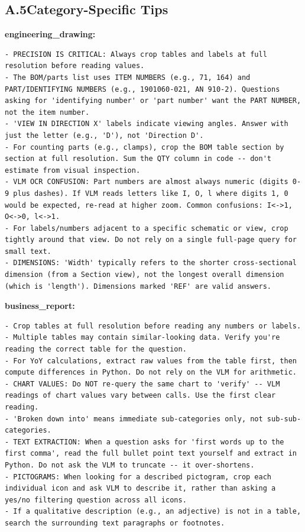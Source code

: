 \documentclass[10pt,twocolumn]{article}
\begin{document}
\subsection*{A.5\quad Category-Specific Tips}

\textbf{engineering\_drawing:}
\begin{lstlisting}
- PRECISION IS CRITICAL: Always crop tables and labels at full resolution before reading values.
- The BOM/parts list uses ITEM NUMBERS (e.g., 71, 164) and PART/IDENTIFYING NUMBERS (e.g., 1901060-021, AN 910-2). Questions asking for 'identifying number' or 'part number' want the PART NUMBER, not the item number.
- 'VIEW IN DIRECTION X' labels indicate viewing angles. Answer with just the letter (e.g., 'D'), not 'Direction D'.
- For counting parts (e.g., clamps), crop the BOM table section by section at full resolution. Sum the QTY column in code -- don't estimate from visual inspection.
- VLM OCR CONFUSION: Part numbers are almost always numeric (digits 0-9 plus dashes). If VLM reads letters like I, O, l where digits 1, 0 would be expected, re-read at higher zoom. Common confusions: I<->1, O<->0, l<->1.
- For labels/numbers adjacent to a specific schematic or view, crop tightly around that view. Do not rely on a single full-page query for small text.
- DIMENSIONS: 'Width' typically refers to the shorter cross-sectional dimension (from a Section view), not the longest overall dimension (which is 'length'). Dimensions marked 'REF' are valid answers.
\end{lstlisting}

\textbf{business\_report:}
\begin{lstlisting}
- Crop tables at full resolution before reading any numbers or labels.
- Multiple tables may contain similar-looking data. Verify you're reading the correct table for the question.
- For YoY calculations, extract raw values from the table first, then compute differences in Python. Do not rely on the VLM for arithmetic.
- CHART VALUES: Do NOT re-query the same chart to 'verify' -- VLM readings of chart values vary between calls. Use the first clear reading.
- 'Broken down into' means immediate sub-categories only, not sub-sub-categories.
- TEXT EXTRACTION: When a question asks for 'first words up to the first comma', read the full bullet point text yourself and extract in Python. Do not ask the VLM to truncate -- it over-shortens.
- PICTOGRAMS: When looking for a described pictogram, crop each individual icon and ask VLM to describe it, rather than asking a yes/no filtering question across all icons.
- If a qualitative description (e.g., an adjective) is not in a table, search the surrounding text paragraphs or footnotes.
\end{lstlisting}
\end{document}
